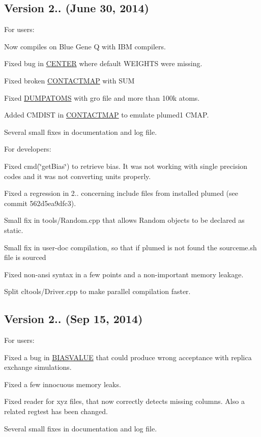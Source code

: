\subsection*{Version 2.. (June 30, 2014) }

For users\+:
\begin{DoxyItemize}
\item Now compiles on Blue Gene Q with I\+B\+M compilers.
\item Fixed bug in \hyperlink{CENTER}{C\+E\+N\+T\+E\+R} where default W\+E\+I\+G\+H\+T\+S were missing.
\item Fixed broken \hyperlink{CONTACTMAP}{C\+O\+N\+T\+A\+C\+T\+M\+A\+P} with S\+U\+M
\item Fixed \hyperlink{DUMPATOMS}{D\+U\+M\+P\+A\+T\+O\+M\+S} with gro file and more than 100k atoms.
\item Added C\+M\+D\+I\+S\+T in \hyperlink{CONTACTMAP}{C\+O\+N\+T\+A\+C\+T\+M\+A\+P} to emulate plumed1 C\+M\+A\+P.
\item Several small fixes in documentation and log file.
\end{DoxyItemize}

For developers\+:
\begin{DoxyItemize}
\item Fixed cmd(\char`\"{}get\+Bias\char`\"{}) to retrieve bias. It was not working with single precision codes and it was not converting units properly.
\item Fixed a regression in 2.. concerning include files from installed plumed (see commit 562d5ea9dfc3).
\item Small fix in tools/\+Random.\+cpp that allows Random objects to be declared as static.
\item Small fix in user-\/doc compilation, so that if plumed is not found the sourceme.\+sh file is sourced
\item Fixed non-\/ansi syntax in a few points and a non-\/important memory leakage.
\item Split cltools/\+Driver.\+cpp to make parallel compilation faster.
\end{DoxyItemize}

\subsection*{Version 2.. (Sep 15, 2014) }

For users\+:
\begin{DoxyItemize}
\item Fixed a bug in \hyperlink{BIASVALUE}{B\+I\+A\+S\+V\+A\+L\+U\+E} that could produce wrong acceptance with replica exchange simulations.
\item Fixed a few innocuous memory leaks.
\item Fixed reader for xyz files, that now correctly detects missing columns. Also a related regtest has been changed.
\item Several small fixes in documentation and log file.
\end{DoxyItemize}

